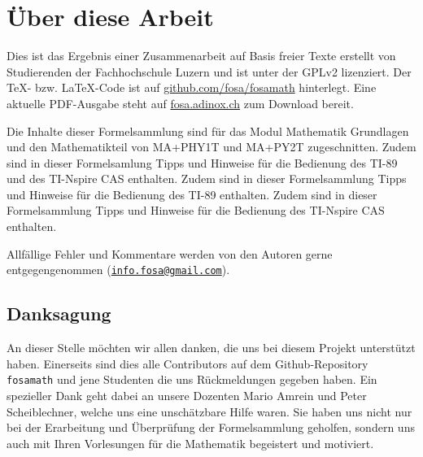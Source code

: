 



\chapter*{Über diese Arbeit}
Dies ist das Ergebnis einer Zusammenarbeit auf Basis freier Texte erstellt von 
Studierenden der Fachhochschule Luzern und ist unter der GPLv2 lizenziert. 
Der \TeX - bzw. \LaTeX -Code ist auf \url{github.com/fosa/fosamath} 
hinterlegt. Eine aktuelle PDF-Ausgabe steht auf \url{fosa.adinox.ch} zum 
Download bereit.

Die Inhalte dieser Formelsammlung sind für das Modul Mathematik Grundlagen 
und den Mathematikteil von MA+PHY1T und MA+PY2T zugeschnitten. 
%
\iftiboth
	Zudem sind in dieser Formelsamlung Tipps und Hinweise für die Bedienung 
    des TI-89 und des TI-Nspire CAS enthalten. 
	\else
	\ifti
		Zudem sind in dieser Formelsammlung Tipps und Hinweise für die 
        Bedienung des TI-89 enthalten. 
	\fi
	\ifnspire
		Zudem sind in dieser Formelsammlung Tipps und Hinweise für die 
        Bedienung des TI-Nspire CAS enthalten. 
	\fi
\fi

Allfällige Fehler und Kommentare werden von den Autoren gerne entgegengenommen
(\href{mailto:info.fosa@gmail.com}{\nolinkurl{info.fosa@gmail.com}}).

\section*{Danksagung}
An dieser Stelle möchten wir allen danken, die uns bei diesem Projekt 
unterstützt haben.
Einerseits sind dies alle Contributors auf dem Github-Repository 
\verb!fosamath! und jene Studenten die uns Rückmeldungen gegeben haben.
Ein spezieller Dank geht dabei an unsere Dozenten Mario Amrein und Peter 
Scheiblechner, welche uns eine unschätzbare Hilfe waren.
Sie haben uns nicht nur bei der Erarbeitung und Überprüfung der Formelsammlung 
geholfen, sondern uns auch mit Ihren Vorlesungen für die Mathematik begeistert 
und motiviert.


